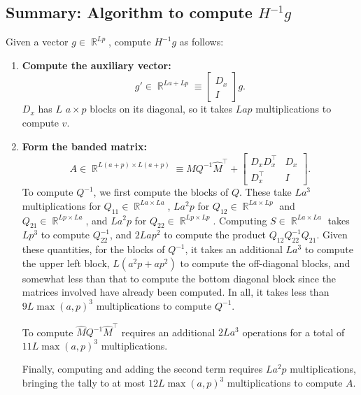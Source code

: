\documentclass{article}
\newcommand{\R}{\mathop{\mathbb{R}}}
\begin{document}
\subsection*{Summary: Algorithm to compute $H^{-1} g$}

Given a vector $g \in \R^{Lp}$, compute $H^{-1} g$ as follows:

\begin{enumerate}
    \item
          \textbf{Compute the auxiliary vector:}
          \[
              g'  \in \R^{La + Lp} \equiv \begin{bmatrix}
                  D_x \\ I
              \end{bmatrix}
              g.
          \]
          $D_x$ has $L$ $a\times p$ blocks on its diagonal, so it takes $Lap$ multiplications to compute $v$.

    \item
          \textbf{Form the banded matrix:}
          \[
              A \in \R^{L(a+p) \times L(a+p)} \equiv \hat{M} Q^{-1} \hat{M}^\top +
              \begin{bmatrix}
                  D_x D_x^\top & D_x \\ D_x^\top & I
              \end{bmatrix}
              .
          \]
          To compute $Q^{-1}$, we first compute the blocks of $Q$. These take $La^3$
          multiplications for $Q_{11} \in \R^{La\times La}$, $La^2p$ for $Q_{12}\in \R^{L
                  a\times Lp}$ and $Q_{21}\in \R^{Lp \times La}$, and $La^2p$ for $Q_{22}\in
              \R^{Lp \times Lp}$. Computing $S\in \R^{La\times La}$ takes $L p^3$ to compute
          $Q_{22}^{-1}$, and $2Lap^2$ to compute the product $Q_{12} Q_{22}^{-1} Q_{21}$.
          Given these quantities, for the blocks of $Q^{-1}$, it takes an additional
          $La^3$ to compute the upper left block, $L(a^2p+ap^2)$ to compute the
          off-diagonal blocks, and somewhat less than that to compute the bottom diagonal
          block since the matrices involved have already been computed. In all, it takes
          less than $9L\max(a,p)^3$ multiplications to compute $Q^{-1}$.

          To compute $\hat{M}Q^{-1}\hat{M}^\top$ requires an additional $2La^3$
          operations for a total of $11L\max(a,p)^3$ multiplications.

          Finally, computing and adding the second term requires $La^2p$ multiplications,
          bringing the tally to at most $12 L \max(a,p)^3$ multiplications to compute
          $A$.


\end{enumerate}
\end{document}
